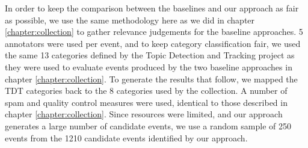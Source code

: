 \label{detection:sec:crowd}
In order to keep the comparison between the baselines and our approach as fair as possible, we use the same methodology here as we did in chapter \ref{chapter:collection} to gather relevance judgements for the baseline approaches.
5 annotators were used per event, and to keep category classification fair, we used the same 13 categories defined by the Topic Detection and Tracking project \citep{Allan:2002:ITD:772260.772262} as they were used to evaluate events produced by the two baseline approaches in chapter \ref{chapter:collection}.
To generate the results that follow, we mapped the TDT categories back to the 8 categories used by the collection.
A number of spam and quality control measures were used, identical to those described in chapter \ref{chapter:collection}.
Since resources were limited, and our approach generates a large number of candidate events, we use a random sample of 250 events from the 1210 candidate events identified by our approach.
